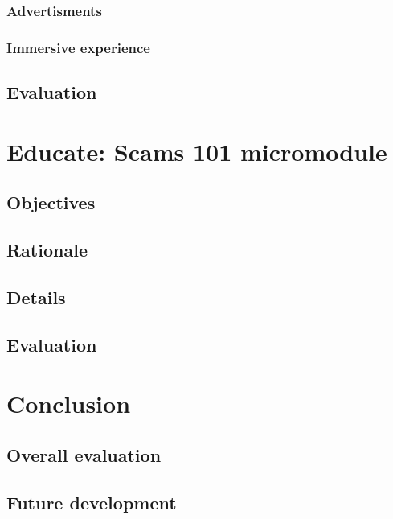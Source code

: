 \message{ !name(written-report.tex)}\documentclass[a4paper]{article}
\begin{document}
\subsubsection{Advertisments}
\subsubsection{Immersive experience}
\subsection{Evaluation}

\section{Educate: Scams 101 micromodule}
\subsection{Objectives}
\subsection{Rationale}
\subsection{Details}
\subsection{Evaluation}

\section{Conclusion}
\subsection{Overall evaluation}
\subsection{Future development}

\newpage

\nocite{*} \printbibliography[heading=bibintoc,title={References}]

\newpage


\begin{appendices}
\end{appendices}


\end{document}
